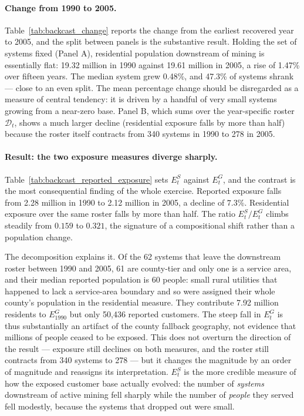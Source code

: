 \documentclass[11pt]{article}
\begin{document}


\paragraph{Change from 1990 to 2005.}
Table~\ref{tab:backcast_change} reports the change from the earliest recovered
year to 2005, and the split between panels is the substantive result. Holding
the set of systems fixed (Panel A), residential population downstream of
mining is essentially flat: 19.32 million in 1990 against 19.61 million in
2005, a rise of 1.47\% over fifteen years. The median system grew 0.48\%, and
47.3\% of systems shrank --- close to an even split. The mean percentage
change should be disregarded as a measure of central tendency: it is driven by
a handful of very small systems growing from a near-zero base. Panel B, which
sums over the year-specific roster $\mathcal{D}_t$, shows a much larger
decline (residential exposure falls by more than half) because the roster
itself contracts from 340 systems in 1990 to 278 in 2005.



\paragraph{Result: the two exposure measures diverge sharply.}
Table~\ref{tab:backcast_reported_exposure} sets $E^{S}_t$ against $E^{G}_t$,
and the contrast is the most consequential finding of the whole exercise.
Reported exposure falls from 2.28 million in 1990 to 2.12 million in 2005, a
decline of $7.3$\%. Residential exposure over the same roster falls by more
than half. The ratio $E^{S}_t/E^{G}_t$ climbs steadily from $0.159$ to
$0.321$, the signature of a compositional shift rather than a population
change.

The decomposition explains it. Of the 62 systems that leave the downstream
roster between 1990 and 2005, 61 are county-tier and only one is a service
area, and their median reported population is 60 people: small rural
utilities that happened to lack a service-area boundary and so were assigned
their whole county's population in the residential measure. They contribute
7.92 million residents to $E^{G}_{1990}$ but only 50,436 reported customers.
The steep fall in $E^{G}_t$ is thus substantially an artifact of the county
fallback geography, not evidence that millions of people ceased to be
exposed. This does not overturn the direction of the result --- exposure
still declines on both measures, and the roster still contracts from 340
systems to 278 --- but it changes the magnitude by an order of magnitude and
reassigns its interpretation. $E^{S}_t$ is the more credible measure of how
the exposed customer base actually evolved: the number of \emph{systems}
downstream of active mining fell sharply while the number of \emph{people}
they served fell modestly, because the systems that dropped out were small.
\end{document}
